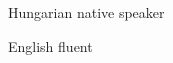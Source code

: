 

\begin{cvskills}


  \cvskill
    {Hungarian} %
    {native speaker} %


  \cvskill
    {English} %
    {fluent} %


\end{cvskills}
